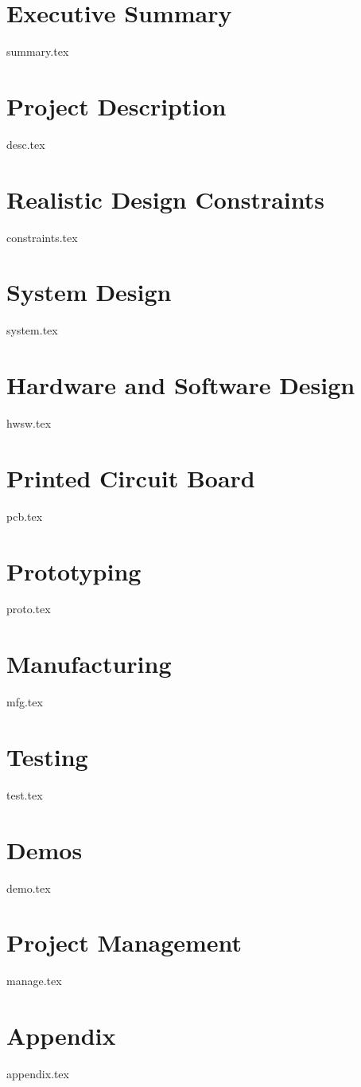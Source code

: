 
\section{Executive Summary}
{summary.tex}

\section{Project Description}
{desc.tex}

\section{Realistic Design Constraints}
{constraints.tex}

\section{System Design}
\label{sec:sys-design}
{system.tex}

\section{Hardware and Software Design}
{hwsw.tex}

\section{Printed Circuit Board}
{pcb.tex}

\section{Prototyping}
{proto.tex}

\section{Manufacturing}
{mfg.tex}

\section{Testing}
{test.tex}

\section{Demos}
{demo.tex}

\section{Project Management}
{manage.tex}

\section{Appendix}
{appendix.tex}

